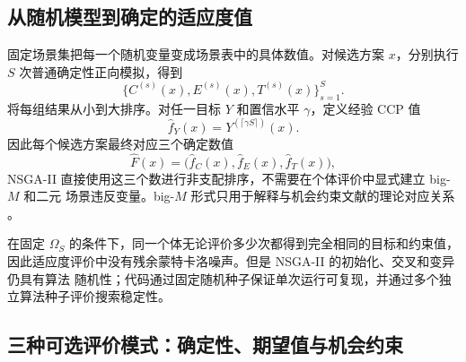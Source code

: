\subsection{从随机模型到确定的适应度值}

固定场景集把每一个随机变量变成场景表中的具体数值。对候选方案 $x$，分别执行 $S$
次普通确定性正向模拟，得到
\begin{equation}
 \{C^{(s)}(x),E^{(s)}(x),T^{(s)}(x)\}_{s=1}^{S}.
\end{equation}
将每组结果从小到大排序。对任一目标 $Y$ 和置信水平 $\gamma$，定义经验 CCP 值
\begin{equation}\label{eq:empirical_quantile_cn}
 \hat f_Y(x)=Y^{(\lceil\gamma S\rceil)}(x).
\end{equation}
因此每个候选方案最终对应三个确定数值
\begin{equation}
 \hat F(x)=\bigl(\hat f_C(x),\hat f_E(x),\hat f_T(x)\bigr),
\end{equation}
NSGA-II 直接使用这三个数进行非支配排序，不需要在个体评价中显式建立 big-$M$ 和二元
场景违反变量。big-$M$ 形式只用于解释与机会约束文献的理论对应关系
\citep{Wang2021CCP,Li2026MOCCP}。

在固定 $\Omega_S$ 的条件下，同一个体无论评价多少次都得到完全相同的目标和约束值，
因此适应度评价中没有残余蒙特卡洛噪声。但是 NSGA-II 的初始化、交叉和变异仍具有算法
随机性；代码通过固定随机种子保证单次运行可复现，并通过多个独立算法种子评价搜索稳定性。

\subsection{三种可选评价模式：确定性、期望值与机会约束}
\label{sec:risk-metric-modes}

